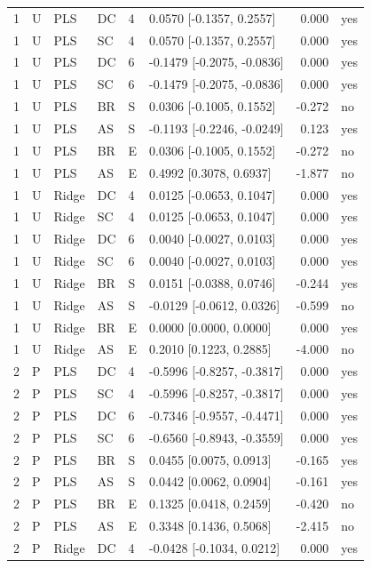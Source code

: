 \documentclass[10pt,a4paper]{article}
\begin{document}
\begin{landscape}
\begin{longtable}{rlllllrl}
1 & U & PLS & DC & 4 & 0.0570 [-0.1357, 0.2557] & 0.000 & yes \\
1 & U & PLS & SC & 4 & 0.0570 [-0.1357, 0.2557] & 0.000 & yes \\
1 & U & PLS & DC & 6 & -0.1479 [-0.2075, -0.0836] & 0.000 & yes \\
1 & U & PLS & SC & 6 & -0.1479 [-0.2075, -0.0836] & 0.000 & yes \\
1 & U & PLS & BR & S & 0.0306 [-0.1005, 0.1552] & -0.272 & no \\
1 & U & PLS & AS & S & -0.1193 [-0.2246, -0.0249] & 0.123 & yes \\
1 & U & PLS & BR & E & 0.0306 [-0.1005, 0.1552] & -0.272 & no \\
1 & U & PLS & AS & E & 0.4992 [0.3078, 0.6937] & -1.877 & no \\
1 & U & Ridge & DC & 4 & 0.0125 [-0.0653, 0.1047] & 0.000 & yes \\
1 & U & Ridge & SC & 4 & 0.0125 [-0.0653, 0.1047] & 0.000 & yes \\
1 & U & Ridge & DC & 6 & 0.0040 [-0.0027, 0.0103] & 0.000 & yes \\
1 & U & Ridge & SC & 6 & 0.0040 [-0.0027, 0.0103] & 0.000 & yes \\
1 & U & Ridge & BR & S & 0.0151 [-0.0388, 0.0746] & -0.244 & yes \\
1 & U & Ridge & AS & S & -0.0129 [-0.0612, 0.0326] & -0.599 & no \\
1 & U & Ridge & BR & E & 0.0000 [0.0000, 0.0000] & 0.000 & yes \\
1 & U & Ridge & AS & E & 0.2010 [0.1223, 0.2885] & -4.000 & no \\
2 & P & PLS & DC & 4 & -0.5996 [-0.8257, -0.3817] & 0.000 & yes \\
2 & P & PLS & SC & 4 & -0.5996 [-0.8257, -0.3817] & 0.000 & yes \\
2 & P & PLS & DC & 6 & -0.7346 [-0.9557, -0.4471] & 0.000 & yes \\
2 & P & PLS & SC & 6 & -0.6560 [-0.8943, -0.3559] & 0.000 & yes \\
2 & P & PLS & BR & S & 0.0455 [0.0075, 0.0913] & -0.165 & yes \\
2 & P & PLS & AS & S & 0.0442 [0.0062, 0.0904] & -0.161 & yes \\
2 & P & PLS & BR & E & 0.1325 [0.0418, 0.2459] & -0.420 & no \\
2 & P & PLS & AS & E & 0.3348 [0.1436, 0.5068] & -2.415 & no \\
2 & P & Ridge & DC & 4 & -0.0428 [-0.1034, 0.0212] & 0.000 & yes \\

\end{longtable}
\end{landscape}
\end{document}
